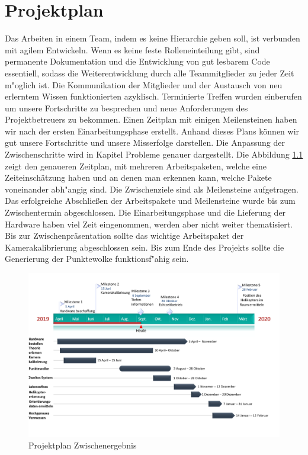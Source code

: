 \chapter{Projektplan}
\label{cha:projektplan}

Das Arbeiten in einem Team, indem es keine Hierarchie geben soll, ist verbunden mit agilem Entwickeln. Wenn es keine feste Rolleneinteilung gibt, sind permanente Dokumentation und die Entwicklung von gut lesbarem Code essentiell, sodass die Weiterentwicklung durch alle Teammitglieder zu jeder Zeit m"oglich ist. Die Kommunikation der Mitglieder und der Austausch von neu erlerntem Wissen funktionierten azyklisch. Terminierte Treffen wurden einberufen um unsere Fortschritte zu besprechen und neue Anforderungen des Projektbetreuers zu bekommen. Einen Zeitplan mit einigen Meilensteinen haben wir nach der ersten Einarbeitungsphase erstellt. Anhand dieses Plans können wir gut unsere Fortschritte und unsere Misserfolge darstellen. Die Anpassung der Zwischenschritte wird in Kapitel Probleme genauer dargestellt.\newline
Die Abbildung \ref{fig:ms1} zeigt den genaueren Zeitplan, mit mehreren Arbeitspaketen, welche eine Zeiteinschätzung haben und an denen man erkennen kann, welche Pakete voneinander abh"angig sind. Die Zwischenziele sind als Meilensteine aufgetragen. Das erfolgreiche Abschließen der Arbeitspakete und Meilensteine wurde bis zum Zwischentermin abgeschlossen. Die Einarbeitungsphase und die Lieferung der Hardware haben viel Zeit eingenommen, werden aber nicht weiter thematisiert. Bis zur Zwischenpräsentation sollte das wichtige Arbeitspaket der Kamerakalibrierung abgeschlossen sein. Bis zum Ende des Projekts sollte die Generierung der Punktewolke funktionsf"ahig sein.

\begin{figure}[H]
	\includegraphics[scale=0.36]{bilder/ms1}
	\caption[Projektplan Zwischenergebnis]{Projektplan Zwischenergebnis}
	\label{fig:ms1}
\end{figure}

